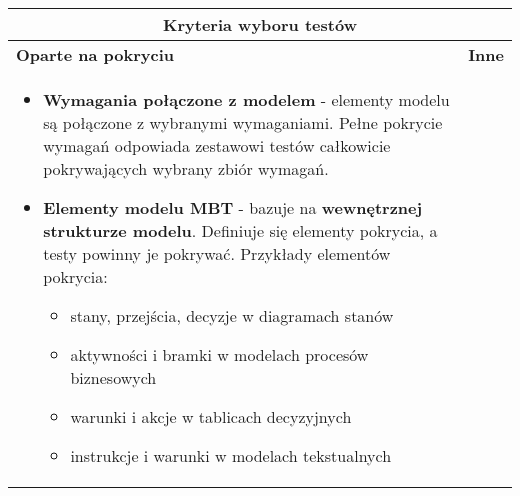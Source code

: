 \documentclass[../main.tex]{subfiles}
\begin{document}
    \begin{table}[H]
        \begin{center}
            \begin{tabular}{| p{8cm} | p{8cm} |}
                \hline
                \multicolumn{2}{|c|}{\textbf{Kryteria wyboru testów}} \\
                \hline
                \textbf{Oparte na pokryciu} & \textbf{Inne} \\
                \hline
                \begin{itemize}
                    \item \textbf{Wymagania połączone z modelem} - elementy modelu są połączone z wybranymi
                    wymaganiami. Pełne pokrycie wymagań odpowiada zestawowi testów całkowicie pokrywających wybrany zbiór wymagań.

                    \item \textbf{Elementy modelu MBT} - bazuje na \textbf{wewnętrznej strukturze modelu}. Definiuje się elementy
                    pokrycia, a testy powinny je pokrywać. Przykłady elementów pokrycia:
                    \begin{itemize}
                        \item stany, przejścia, decyzje w diagramach stanów
                        \item aktywności i bramki w modelach procesów biznesowych
                        \item warunki i akcje w tablicach decyzyjnych
                        \item instrukcje i warunki w modelach tekstualnych
                    \end{itemize}


\end{itemize}
\end{tabular}
\end{center}
\end{table}
\end{document}
